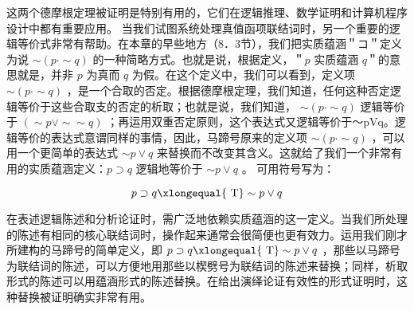 这两个德摩根定理被证明是特别有用的，它们在逻辑推理、数学证明和计算机程序设计中都有重要应用。
当我们试图系统处理真值函项联结词时，另一个重要的逻辑等价式非常有帮助。在本章的早些地方（8．3节），我们把实质蕴涵＂コ＂定义为说 $\sim(p \cdot \sim q)$ 的一种简略方式。也就是说，根据定义，＂$p$ 实质蕴涵 $q$＂的意思就是，并非 $p$ 为真而 $q$ 为假。在这个定义中，我们可以看到，定义项 $\sim(p \cdot \sim q)$ ，是一个合取的否定。根据德摩根定理，我们知道，任何这种否定逻辑等价于这些合取支的否定的析取；也就是说，我们知道， $\sim(p \cdot \sim q)$ 逻辑等价于 $(\sim p \vee \sim \sim q)$ ；再运用双重否定原则，这个表达式又逻辑等价于～pVq。逻辑等价的表达式意谓同样的事情，因此，马蹄号原来的定义项 $\sim(p \cdot \sim q)$ ，可以用一个更简单的表达式 $\sim p \vee q$ 来替换而不改变其含义。这就给了我们一个非常有用的实质蕴涵定义：$p \supset q$ 逻辑地等价于 $\sim p \vee q$ 。 可用符号写为：

$$
p \supset q \xlongequal{\mathrm{~T}} \sim p \vee q
$$

在表述逻辑陈述和分析论证时，需广泛地依赖实质蕴涵的这一定义。当我们所处理的陈述有相同的核心联结词时，操作起来通常会很简便也更有效力。运用我们刚才所建构的马蹄号的简单定义，即 $p \supset q \xlongequal{\mathrm{~T}} \sim p \vee q$ ，那些以马蹄号为联结词的陈述，可以方便地用那些以楔劈号为联结词的陈述来替换；同样，析取形式的陈述可以用蕴涵形式的陈述替换。在给出演绎论证有效性的形式证明时，这种替换被证明确实非常有用。

